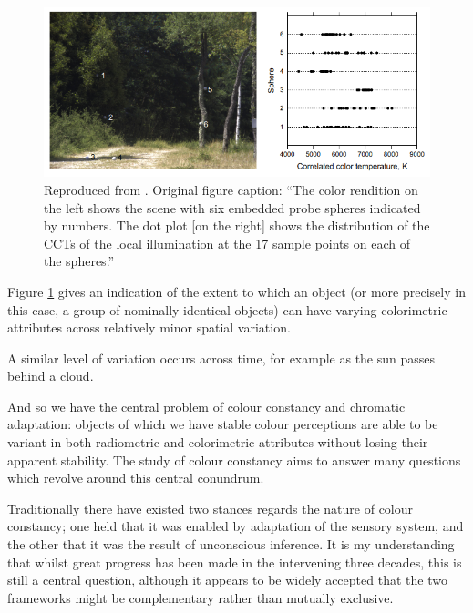 \begin{figure}[htbp]
\includegraphics[max width=\textwidth]{figs/LitRev/greyballs.png}
\caption{Reproduced from \citet{nascimento_spatial_2014}. Original figure caption: ``The color rendition on the left shows the scene with six embedded probe spheres indicated by numbers. The dot plot [on the right] shows the distribution of the CCTs of the local illumination at the 17 sample points on each of the spheres.''}
\label{fig:greyballs}
\end{figure}

Figure \ref{fig:greyballs} gives an indication of the extent to which an object (or more precisely in this case, a group of nominally identical objects) can have varying colorimetric attributes across relatively minor spatial variation. 


A similar level of variation occurs across time, for example as the sun passes behind a cloud.

And so we have the central problem of colour constancy and chromatic adaptation: objects of which we have stable colour perceptions are able to be variant in both radiometric and colorimetric attributes without losing their apparent stability. The study of colour constancy aims to answer many questions which revolve around this central conundrum.

Traditionally %
there have existed two stances regards the nature of colour constancy; one held that it was enabled by adaptation of the sensory system, and the other that it was the result of unconscious inference. %
It is my understanding that whilst great progress has been made in the intervening three decades, this is still a central question, although it appears to be widely accepted that the two frameworks might be complementary rather than mutually exclusive. %

